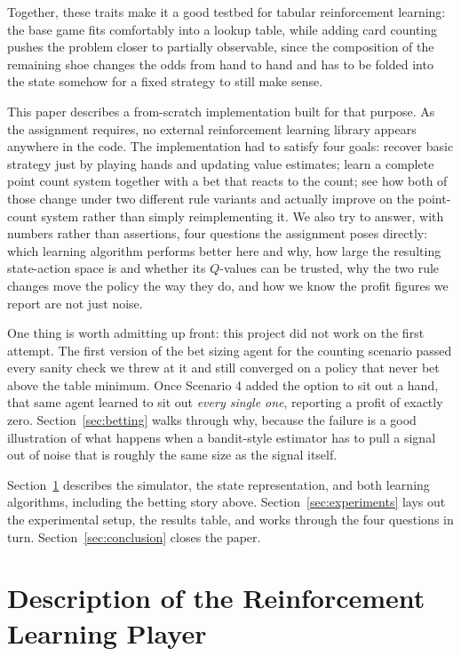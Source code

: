 \documentclass[conference,a4paper]{IEEEtran}
\begin{document}
Together, these traits make it a good testbed for tabular reinforcement learning: the base game fits comfortably into a lookup table, while adding card counting pushes the problem closer to partially observable, since the composition of the remaining shoe changes the odds from hand to hand and has to be folded into the state somehow for a fixed strategy to still make sense.

This paper describes a from-scratch implementation built for that purpose. As the assignment requires, no external reinforcement learning library appears anywhere in the code. The implementation had to satisfy four goals: recover basic strategy just by playing hands and updating value estimates; learn a complete point count system together with a bet that reacts to the count; see how both of those change under two different rule variants and actually improve on the point-count system rather than simply reimplementing it. We also try to answer, with numbers rather than assertions, four questions the assignment poses directly: which learning algorithm performs better here and why, how large the resulting state-action space is and whether its $Q$-values can be trusted, why the two rule changes move the policy the way they do, and how we know the profit figures we report are not just noise.

One thing is worth admitting up front: this project did not work on the first attempt. The first version of the bet sizing agent for the counting scenario passed every sanity check we threw at it and still converged on a policy that never bet above the table minimum. Once Scenario 4 added the option to sit out a hand, that same agent learned to sit out \emph{every single one}, reporting a profit of exactly zero. Section~\ref{sec:betting} walks through why, because the failure is a good illustration of what happens when a bandit-style estimator has to pull a signal out of noise that is roughly the same size as the signal itself.

Section~\ref{sec:method} describes the simulator, the state representation, and both learning algorithms, including the betting story above. Section~\ref{sec:experiments} lays out the experimental setup, the results table, and works through the four questions in turn. Section~\ref{sec:conclusion} closes the paper.

\section{Description of the Reinforcement Learning Player}
\label{sec:method}
\end{document}
